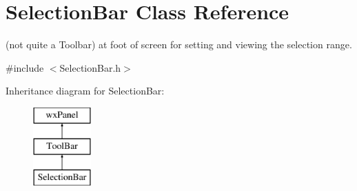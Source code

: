 \hypertarget{class_selection_bar}{}\section{Selection\+Bar Class Reference}
\label{class_selection_bar}


(not quite a Toolbar) at foot of screen for setting and viewing the selection range.  




{\ttfamily \#include $<$Selection\+Bar.\+h$>$}

Inheritance diagram for Selection\+Bar\+:\begin{figure}[H]
\begin{center}
\leavevmode
\includegraphics[height=3.000000cm]{class_selection_bar}
\end{center}
\end{figure}
